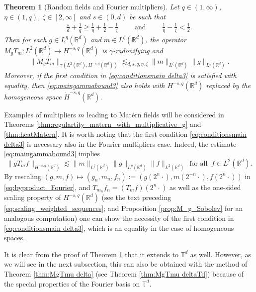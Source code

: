 \documentclass[reqno]{amsart}
\theoremstyle{plain}
\newtheorem{theorem}{Theorem}[section]
\theoremstyle{remark}
\theoremstyle{plain}
\numberwithin{equation}{section}
\def\R{{\mathbb R}}
\newcommand{\T}{\mathbb{T}}
\newcommand{\1}{\one}
\begin{document}
\begin{theorem}[Random fields and Fourier multipliers]\label{thm:Randomfield}
Let $q\in (1, \infty)$, $\eta\in (1, q)$, $\zeta\in [2, \infty]$ and $s\in(0,d)$ be such that 
\begin{align}\label{eq:conditionsmain delta3}
\frac{s}{d} + \frac{1}{q}  \geq \frac{1}{\eta} + \frac{1}{2} - \frac{1}{\zeta}\qquad \text{ and }\qquad 
\frac{1}{\eta} - \frac{1}{\zeta}<\frac{1}{2}.
\end{align}
Then for each $g\in L^{\eta}(\R^d)$ and $m\in L^{\zeta}(\R^d)$, the operator 
$M_g T_m:L^2(\R^d)\to H^{-s,q}(\R^d)$ is $\gamma$-radonifying and 
\begin{align}\label{eq:maingammabound3}
\|M_g T_m\|_{\gamma(L^2(\R^d),H^{-s,q}(\R^d))}\lesssim_{d,s,q,\eta,\zeta} \|m\|_{L^{\zeta}(\R^d)} \|g\|_{L^{\eta}(\R^d)}.
\end{align} 
Moreover, if the first condition in \eqref{eq:conditionsmain delta3} is satisfied with equality, then \eqref{eq:maingammabound3} also holds with $H^{-s,q}(\R^d)$ replaced by the homogeneous space $\dot{H}^{-s,q}(\R^d)$.
\end{theorem}
Examples of multipliers $m$ leading to Mat\'ern fields will be considered in Theorems \ref{thm:regulartity_matern_with_multiplicative_g} and  \ref{thm:heatMatern}. It is worth noting that the first condition \eqref{eq:conditionsmain delta3} is necessary also in the Fourier multipliers case. Indeed, the estimate \eqref{eq:maingammabound3} implies 
\begin{equation}
\label{eq:byproduct_Fourier}
\|g T_m f\|_{H^{-s,q}(\R^d)}\lesssim \|m\|_{L^\zeta(\R^d)}\|g\|_{L^\eta(\R^d)}\|f\|_{L^2(\R^d)} \ \ \text{for all }\ f\in L^2(\R^d).
\end{equation}
By rescaling $(g,m,f)\mapsto (g_n,m_n,f_n):=(g(2^n\cdot),m(2^{-n}\cdot),f(2^n\cdot))$ in \eqref{eq:byproduct_Fourier}, and $T_{m_n} f_n= (T_m f)(2^n \cdot)$ as well as the one-sided scaling property of $H^{-s,q}(\R^d)$ (see the text preceding \eqref{eq:scaling_weighted_sequences}; 
and Proposition \ref{prop:M_g_Sobolev} for an analogous computation)
one can show the necessity of the first condition in \eqref{eq:conditionsmain delta3}, which is an equality in the case of homogeneous spaces.

\smallskip

It is clear from the proof of Theorem \ref{thm:Randomfield} that it extends to $\T^d$ as well. However, as we will see in the next subsection, this can also be obtained with the method of Theorem \ref{thm:MgTmu delta} (see Theorem \ref{thm:MgTmu deltaTd}) because of the special properties of the Fourier basis on $\T^d$.
\end{document}
